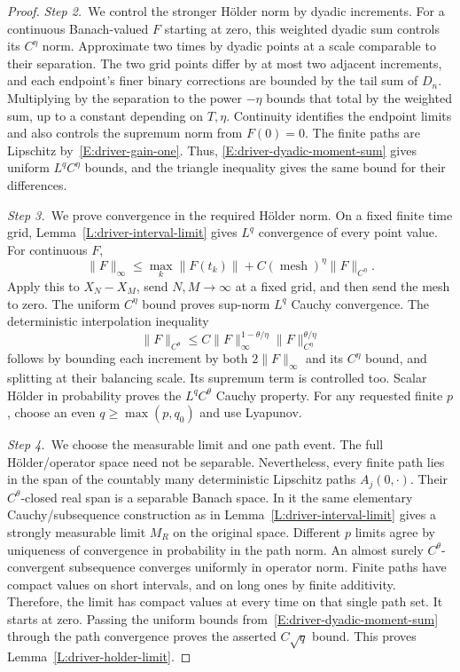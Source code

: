 \begin{proof}
  \medskip
  \noindent\textit{Step 2.~}We control the stronger Hölder norm by dyadic
  increments.
  For a continuous Banach-valued $F$ starting at zero, this weighted dyadic sum
  controls its $C^\eta$ norm. Approximate two times by dyadic points at a scale
  comparable to their separation. The two grid points differ by at most two
  adjacent increments, and each endpoint's finer binary corrections are bounded
  by the tail sum of $D_n$. Multiplying by the separation to the power $-\eta$
  bounds that total by the weighted sum, up to a constant depending on $T,\eta$.
  Continuity identifies the endpoint limits and also controls the supremum norm
  from $F(0) = 0$. The finite paths are Lipschitz by~\eqref{E:driver-gain-one}.
  Thus, \eqref{E:driver-dyadic-moment-sum} gives uniform $L^qC^\eta$ bounds, and
  the triangle inequality gives the same bound for their differences.

  \medskip
  \noindent\textit{Step 3.~}We prove convergence in the required Hölder norm.
  On a fixed finite time grid, Lemma~\ref{L:driver-interval-limit} gives $L^q$
  convergence of every point value. For continuous $F$,
  \[
    \|F\|_\infty\le\max_k\|F(t_k)\|
    +C(\operatorname{mesh})^\eta\|F\|_{C^\eta}.
  \]
  Apply this to $X_N-X_M$, send $N,M \to \infty$ at a fixed grid, and then send
  the mesh to zero. The uniform $C^\eta$ bound proves sup-norm $L^q$ Cauchy
  convergence. The deterministic interpolation inequality
  \begin{equation}\label{E:driver-holder-interpolation}
    \|F\|_{C^\theta}
    \le C\|F\|_\infty^{1-\theta/\eta}
    \|F\|_{C^\eta}^{\theta/\eta}
  \end{equation}
  follows by bounding each increment by both $2\|F\|_\infty$ and its $C^\eta$
  bound, and splitting at their balancing scale. Its supremum term is controlled
  too. Scalar H\"older in probability proves the $L^qC^\theta$ Cauchy property.
  For any requested finite $p$, choose an even $q \ge \max(p,q_0)$ and use
  Lyapunov.

  \medskip
  \noindent\textit{Step 4.~}We choose the measurable limit and one path event.
  The full H\"older/operator space need not be separable. Nevertheless, every
  finite path lies in the span of the countably many deterministic Lipschitz
  paths $A_j(0,\cdot)$. Their $C^\theta$-closed real span is a separable Banach
  space. In it the same elementary Cauchy/subsequence construction as in
  Lemma~\ref{L:driver-interval-limit} gives a strongly measurable limit $M_R$ on
  the original space. Different $p$ limits agree by uniqueness of convergence in
  probability in the path norm. An almost surely $C^\theta$-convergent
  subsequence converges uniformly in operator norm. Finite paths have compact
  values on short intervals, and on long ones by finite additivity. Therefore,
  the limit has compact values at every time on that single path set. It starts
  at zero. Passing the uniform bounds from~\eqref{E:driver-dyadic-moment-sum}
  through the path convergence proves the asserted $C\sqrt q$ bound. This proves
  Lemma~\ref{L:driver-holder-limit}.
\end{proof}

